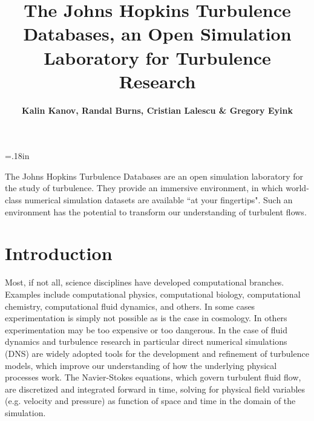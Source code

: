 \documentclass[10pt,twocolumn]{article}
\begin{document}
\title{\Large \bf \color{bl} The Johns Hopkins Turbulence Databases, an Open Simulation Laboratory for Turbulence Research} 
\author{\bf Kalin Kanov, Randal Burns, Cristian Lalescu \& Gregory Eyink} 
\baselineskip=.18in
  
\twocolumn[\maketitle]

\setcounter{page}{1}

The Johns Hopkins Turbulence Databases are an open simulation laboratory for the study of turbulence. They provide an immersive environment, in which
world-class numerical simulation datasets are available ``at your fingertips". Such an environment has the potential to transform our understanding of
turbulent flows.

 
\vspace{-0.2in}
\section{Introduction}
\label{sec-introduction}
\vspace{-0.15in}

Most, if not all, science disciplines have developed computational branches. Examples include computational physics, computational biology,
computational chemistry, computational fluid dynamics, and others. In some cases experimentation is simply not possible as is the case in cosmology.
In others experimentation may be too expensive or too dangerous. In the case of fluid dynamics and turbulence research in particular direct numerical
simulations (DNS) are widely adopted tools for the development and refinement of turbulence models, which improve our understanding of how the
underlying physical processes work. The Navier-Stokes equations, which govern
turbulent fluid flow, are discretized and integrated forward in time, solving for physical field variables (e.g. velocity and pressure) as function of space 
and time in the domain of the simulation. 
\end{document}
